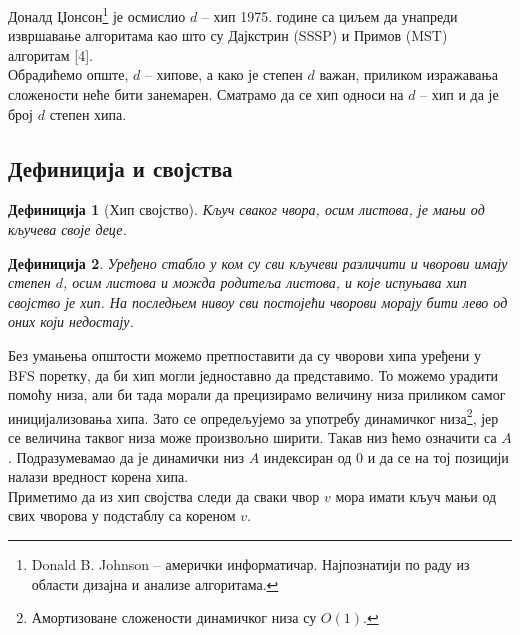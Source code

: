\documentclass[11pt, a4paper]{article}
\newtheorem{definicija}{\selectlanguage{russian} Дефиниција} [subsection]
\theoremstyle{remark}
\numberwithin{equation}{section}
\begin{document}
	Доналд Џонсон\footnote{Donald B. Johnson -- амерички информатичар. Најпознатији по раду из области дизајна и анализе алгоритама.} је осмислио $d$ -- хип 1975. године са циљем да унапреди извршавање алгоритама као што су Дајкстрин (SSSP) и Примов (MST) алгоритам [4]. \\
	
	\noindent Обрадићемо опште, $d$ -- хипове, а како је степен $d$ важан, приликом изражавања сложености неће бити занемарен. Сматрамо да се хип односи на $d$ -- хип и да је број $d$ степен хипа.
	\subsection{Дефиниција и својства}

	\begin{definicija} [Хип својство]
		\normalfont Кључ сваког чвора, осим листова, је мањи од кључева своје деце.
	\end{definicija}
	\begin{definicija}
		\normalfont Уређено стабло у ком су сви кључеви различити и чворови имају степен $d$, осим листова и можда родитеља листова, и које испуњава хип својство је \textit{хип}. На последњем нивоу сви постојећи чворови морају бити лево од оних који недостају.
	\end{definicija}

	\indent Без умањења општости можемо претпоставити да су чворови хипа уређени у BFS поретку, да би хип могли једноставно да представимо. То можемо урадити помоћу низа, али би тада морали да прецизирамо величину низа приликом самог иницијализовања хипа. Зато се опредељујемо за употребу динамичког низа\footnote{Амортизоване сложености динамичког низа су $O(1)$.}, јер се величина таквог низа може произвољно ширити. Такав низ ћемо означити са $A$. Подразумевамао да је динамички низ $A$ индексиран од $0$ и да се на тој позицији налази вредност корена хипа. \\
	\indent Приметимо да из хип својства следи да сваки чвор $v$ мора имати кључ мањи од свих чворова у подстаблу са кореном $v$.
\end{document}
